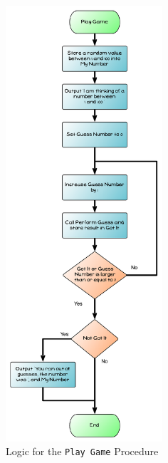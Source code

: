 \begin{figure}[htbp]
   \centering
   \includegraphics[width=0.52\textwidth]{./topics/control-flow/diagrams/PlayGame} 
   \caption{Logic for the \texttt{Play Game} Procedure}
   \label{fig:play-game}
\end{figure}

